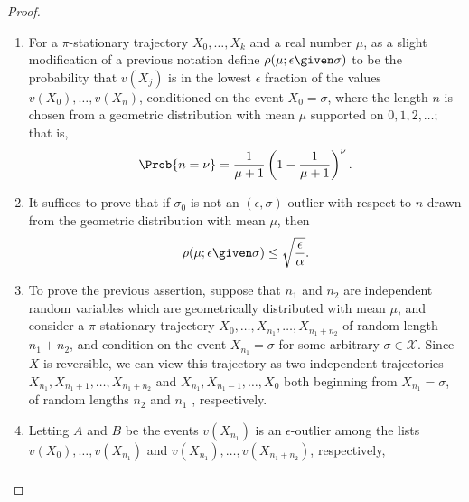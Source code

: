 \documentclass[12pt]{article}
\begin{document}
\begin{proof}
    \begin{enumerate}
        \item
            For a \( \pi \)-stationary trajectory \( X_0, \dots, X_k \)
            and a real number \( \mu \), as a slight modification of a
            previous notation define \( \rho(\mu; \epsilon
            \given \sigma) \) to be the probability that \( v(X_j) \) is
            in the lowest \( \epsilon \) fraction of the values \( v(X_0),
            \dots, v(X_n) \), conditioned on the event \( X_0 = \sigma \),
            where the length \( n \) is chosen from a geometric
            distribution with mean \( \mu \) supported on \( 0,1,2,\dots
            \); that is,
            \[
                \Prob{n = \nu} = \frac{1}{\mu+1}\left( 1 - \frac{1}{\mu+1}
                \right)^\nu.
            \]
        \item
            \label{enum:parallelchain:eq15} It suffices to prove that if \(
            \sigma_0 \) is not an \( (\epsilon, \sigma) \)-outlier with
            respect to \( n \) drawn from the geometric distribution
            with mean \( \mu \), then
            \[
                \rho(\mu; \epsilon \given \sigma) \le \sqrt{\frac{\epsilon}
                {\alpha}}.
            \]
        \item
            To prove the previous assertion, suppose that \( n_1 \) and \(
            n_2 \) are independent random variables which are
            geometrically distributed with mean \( \mu \), and consider
            a \( \pi \)-stationary trajectory \( X_0, \dots, X_{n_1},
            \dots, X_{n_1 +n_2} \) of random length \( n_1 + n_2 \), and
            condition on the event \( X_{n_1} = \sigma \) for some
            arbitrary \( \sigma \in \mathcal{X} \).  Since \( X \) is
            reversible, we can view this trajectory as two independent
            trajectories \( X_{n_1}, X_{n_1 +1}, \dots, X_{n_1 +n_2} \)
            and \( X_{n_1}, X_{n_1 - 1}, \dots, X_0 \) both
            beginning from \( X_{n_1} = \sigma \), of random lengths \(
            n_2 \) and \( n_1 \) , respectively.
        \item
            \label{enum:parallelchain:eq16} Letting \( A \) and \( B \)
            be the events \( v(X_{n_1}) \) is an \( \epsilon \)-outlier
            among the lists \( v(X_0 ), \dots, v(X_{n_1}) \) and \( v(X_
            {n_1}), \dots, v(X_{n_1 +n_2}) \), respectively,
            \begin{multline*}

\end{multline*}
\end{enumerate}
\end{proof}
\end{document}
